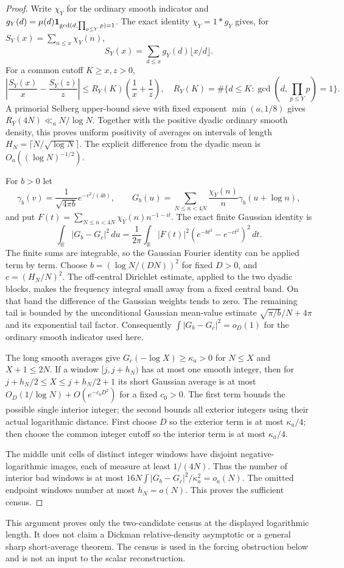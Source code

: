 \begin{proof}
Write $\chi_Y$ for the ordinary smooth indicator and
$g_Y(d)=\mu(d)\mathbf 1_{\gcd(d,\prod_{p\leq Y}p)=1}$.
The exact identity $\chi_Y=1*g_Y$ gives, for
$S_Y(x)=\sum_{n\leq x}\chi_Y(n)$,
\[
 S_Y(x)=\sum_{d\leq x}g_Y(d)\lfloor x/d\rfloor .
\]
For a common cutoff $K\geq x,z>0$,
\[
 \left|\frac{S_Y(x)}x-\frac{S_Y(z)}z\right|
 \leq R_Y(K)\left(\frac1x+\frac1z\right),
 \quad
 R_Y(K)=\#\{d\leq K:\gcd(d,\prod_{p\leq Y}p)=1\}.
\]
A primorial Selberg upper-bound sieve with fixed exponent
$\min(a,1/8)$ gives $R_Y(4N)\ll_a N/\log N$.
Together with the positive dyadic ordinary smooth density, this proves
uniform positivity of averages on intervals of length
$H_N=\lceil N/\sqrt{\log N}\rceil$.
The explicit difference from the dyadic mean is
$O_a((\log N)^{-1/2})$.

For $b>0$ let
\[
 \gamma_b(v)=\frac1{\sqrt{4\pi b}}e^{-v^2/(4b)},\qquad
 G_b(u)=\sum_{N\leq n<4N}\frac{\chi_Y(n)}n
                  \gamma_b(u+\log n),
\]
and put
$F(t)=\sum_{N\leq n<4N}\chi_Y(n)n^{-1-it}$.
The exact finite Gaussian identity is
\[
 \int_{\mathbb R}|G_b-G_c|^2\,du
 =\frac1{2\pi}\int_{\mathbb R}|F(t)|^2
                 (e^{-bt^2}-e^{-ct^2})^2\,dt .
\]
The finite sums are integrable, so the Gaussian Fourier identity
can be applied term by term.
Choose $b=(\log N/(DN))^2$ for fixed $D>0$, and
$c=(H_N/N)^2$.
The off-central Dirichlet estimate, applied to the two dyadic
blocks, makes the frequency integral small away from a fixed central
band.  On that band the difference of the Gaussian weights tends to
zero.  The remaining tail is bounded by the unconditional Gaussian
mean-value estimate
$\sqrt{\pi/b}/N+4\pi$ and its exponential tail factor.
Consequently $\int|G_b-G_c|^2=o_D(1)$ for the ordinary smooth
indicator used here.

The long smooth averages give $G_c(-\log X)\geq\kappa_a>0$
for $N\leq X$ and $X+1\leq2N$.
If a window $[j,j+h_N)$ has at most one smooth integer, then for
$j+h_N/2\leq X\leq j+h_N/2+1$ its short Gaussian average is at most
$O_D(1/\log N)+O(e^{-c_0D^2})$ for a fixed $c_0>0$.
The first term bounds the possible single interior integer; the
second bounds all exterior integers using their actual logarithmic
distance.  First choose $D$ so the exterior term is at most $\kappa_a/4$;
then choose the common integer cutoff so the interior term is at most
$\kappa_a/4$.

The middle unit cells of distinct integer windows have disjoint
negative-logarithmic images, each of measure at least $1/(4N)$.
Thus the number of interior bad windows is at most
$16N\int|G_b-G_c|^2/\kappa_a^2=o_a(N)$.
The omitted endpoint windows number at most $h_N=o(N)$.
This proves the sufficient census.
\end{proof}
This argument proves only the two-candidate census at the displayed
logarithmic length. It does not claim a Dickman relative-density
asymptotic or a general sharp short-average theorem. The census is
used in the forcing obstruction below and is not an input to the
scalar reconstruction.

